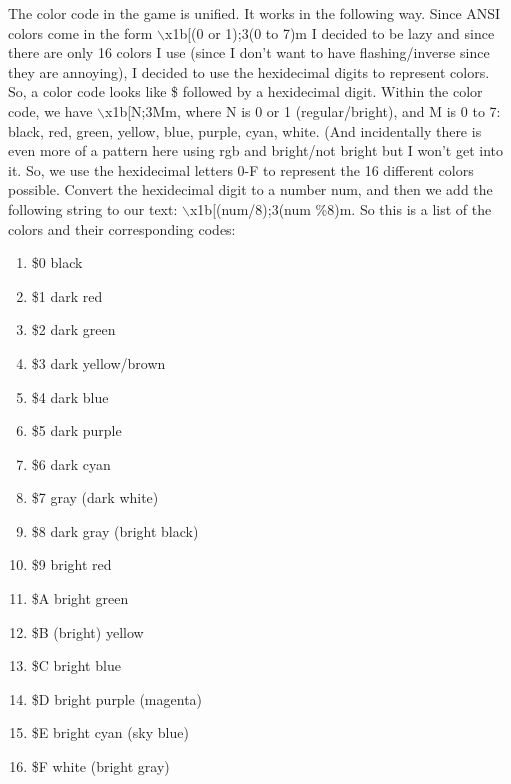 The color code in the game is unified. It works in the following
way. Since ANSI colors come in the form $\backslash$x1b[(0 or 1);3(0
to 7)m I decided to be lazy and since there are only 16 colors I use
(since I don't want to have flashing/inverse since they are annoying),
I decided to use the hexidecimal digits to represent colors. So, a
color code looks like \$ followed by a hexidecimal digit. Within the
color code, we have $\backslash$x1b[N;3Mm, where N is 0 or 1
(regular/bright), and M is 0 to 7: black, red, green, yellow, blue,
purple, cyan, white. (And incidentally there is even more of a pattern
here using rgb and bright/not bright but I won't get into it. So, we
use the hexidecimal letters 0-F to represent the 16 different colors
possible. Convert the hexidecimal digit to a number num, and then we
add the following string to our text: $\backslash$x1b[(num/8);3(num
\%8)m. So this is a list of the colors and their corresponding codes:

\begin{enumerate}

\item \$0 black

\item \$1 dark red

\item \$2 dark green

\item \$3 dark yellow/brown

\item \$4 dark blue

\item \$5 dark purple

\item \$6 dark cyan

\item \$7 gray (dark white)

\item \$8 dark gray (bright black)

\item \$9 bright red

\item \$A bright green

\item \$B (bright) yellow

\item \$C bright blue

\item \$D bright purple (magenta)

\item \$E bright cyan (sky blue)

\item \$F white (bright gray)

\end{enumerate}

